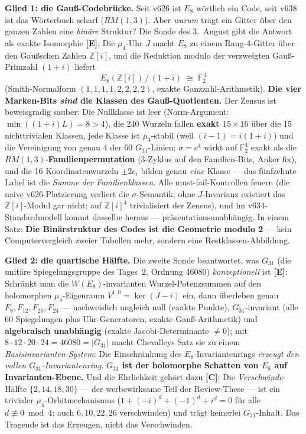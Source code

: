 \documentclass[11pt,a4paper]{article}
\newcommand{\E}{\textcolor{gut}{\textbf{[E]}}}
\newcommand{\C}{\textcolor{kern}{\textbf{[C]}}}
\begin{document}
\textbf{Glied 1: die Gauß-Codebrücke.} Seit v626 ist $E_8$ wörtlich
ein Code, seit v638 ist das Wörterbuch scharf ($RM(1,3)$). Aber
\emph{warum} trägt ein Gitter über den ganzen Zahlen eine
\emph{binäre} Struktur? Die Sonde des 3.~August gibt die Antwort als
exakte Isomorphie \E{}: Die $\mu_4$-Uhr $J$ macht $E_8$ zu einem
Rang-4-Gitter über den Gaußschen Zahlen $\mathbb{Z}[i]$, und die
Reduktion modulo der verzweigten Gauß-Primzahl $(1+i)$ liefert
\[
E_8(\mathbb{Z}[i]) \,/\, (1+i) \;\cong\; \mathbb{F}_2^{\,4}
\]
(Smith-Normalform $(1,1,1,1,2,2,2,2)$, exakte
Ganzzahl-Arithmetik). \textbf{Die vier Marken-Bits \emph{sind} die
Klassen des Gauß-Quotienten.} Der Zensus ist beweisgradig sauber:
Die Nullklasse ist leer (Norm-Argument: $\min((1+i)L) = 8 > 4$), die
240 Wurzeln fallen \textbf{exakt $15 \times 16$} über die 15
nichttrivialen Klassen, jede Klasse ist $\mu_4$-stabil (weil $(i-1)
= i(1+i)$) und die Vereinigung von genau 4 der 60 $G_{31}$-Linien;
$\sigma = c^4$ wirkt auf $\mathbb{F}_2^4$ exakt als die
$RM(1,3)$-\textbf{Familienpermutation} (3-Zyklus auf den
Familien-Bits, Anker fix), und die 16 Koordinatenwurzeln $\pm 2e_i$
bilden genau \emph{eine} Klasse --- das \glqq{}fünfzehnte
Label\grqq{} ist die \emph{Summe der Familienklassen}. Alle
must-fail-Kontrollen feuern (die naive v626-Platzierung verliert die
$\sigma$-Semantik; ohne $J$-Invarianz existiert das
$\mathbb{Z}[i]$-Modul gar nicht; auf $\mathbb{Z}[i]^4$
trivialisiert der Zensus), und im v634-Standardmodell kommt
dasselbe heraus --- präsentationsunabhängig. In einem Satz:
\textbf{Die Binärstruktur des Codes ist die Geometrie modulo 2} ---
kein Computervergleich zweier Tabellen mehr, sondern eine
Restklassen-Abbildung.

\textbf{Glied 2: die quartische Hälfte.} Die zweite Sonde beantwortet,
was $G_{31}$ (die unitäre Spiegelungsgruppe des Tages~2, Ordnung
46080) \emph{konzeptionell} ist \E{}: Schränkt man die
$W(E_8)$-invarianten Wurzel-Potenzsummen auf den holomorphen
$\mu_4$-Eigenraum $V^{1,0} = \ker(J - i)$ ein, dann überleben genau
$F_8, F_{12}, F_{20}, F_{24}$ --- nachweislich ungleich null
(exakte Punkte), $G_{31}$-invariant (alle 60 Spiegelungen plus
Uhr-Generatoren, exakte Gauß-Arithmetik) und \textbf{algebraisch
unabhängig} (exakte Jacobi-Determinante $\ne 0$); mit $8 \cdot 12
\cdot 20 \cdot 24 = 46080 = |G_{31}|$ macht Chevalleys Satz sie zu
einem \emph{Basisinvarianten-System}: Die Einschränkung des
$E_8$-Invariantenrings \emph{erzeugt den vollen
$G_{31}$-Invariantenring}. \textbf{$G_{31}$ ist der holomorphe
Schatten von $E_8$ auf Invarianten-Ebene.} Und die Ehrlichkeit
gehört dazu \C{}: Die \emph{Verschwinde}-Hälfte $\{2, 14, 18, 30\}$
--- der werbewirksame Teil der Review-These --- ist ein trivialer
$\mu_4$-Orbitmechanismus ($1 + (-i)^d + (-1)^d + i^d = 0$ für alle
$d \not\equiv 0 \bmod 4$; auch $6, 10, 22, 26$ verschwinden) und
trägt keinerlei $G_{31}$-Inhalt. Das Tragende ist das Erzeugen, nicht
das Verschwinden.
\end{document}
